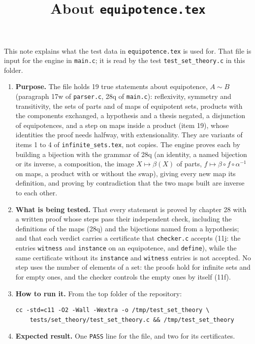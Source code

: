 \documentclass[11pt,a4paper]{article}
\title{About \texttt{equipotence.tex}}
\author{}
\date{}
\begin{document}
\maketitle
This note explains what the test data in \texttt{equipotence.tex} is used for. That file is input for the engine in \texttt{main.c}; it is read by the test \texttt{test\_set\_theory.c} in this folder.

\begin{enumerate}
\item \textbf{Purpose.} The file holds 19 true statements about equipotence, $A \sim B$ (paragraph 17w of \texttt{parser.c}, 28q of \texttt{main.c}): reflexivity, symmetry and transitivity, the sets of parts and of maps of equipotent sets, products with the components exchanged, a hypothesis and a thesis negated, a disjunction of equipotences, and a step on maps inside a product (item 19), whose identities the proof needs halfway, with extensionality. They are variants of items 1 to 4 of \texttt{infinite\_sets.tex}, not copies. The engine proves each by building a bijection with the grammar of 28q (an identity, a named bijection or its inverse, a composition, the image $X \mapsto \beta(X)$ of parts, $f \mapsto \beta \circ f \circ \alpha^{-1}$ on maps, a product with or without the swap), giving every new map its definition, and proving by contradiction that the two maps built are inverse to each other.

\item \textbf{What is being tested.} That every statement is proved by chapter 28 with a written proof whose steps pass their independent check, including the definitions of the maps (28q) and the bijections named from a hypothesis; and that each verdict carries a certificate that \texttt{checker.c} accepts (11j: the entries \texttt{witness} and \texttt{instance} on an equipotence, and \texttt{define}), while the same certificate without its \texttt{instance} and \texttt{witness} entries is not accepted. No step uses the number of elements of a set: the proofs hold for infinite sets and for empty ones, and the checker controls the empty ones by itself (11f).

\item \textbf{How to run it.} From the top folder of the repository:
\begin{verbatim}
cc -std=c11 -O2 -Wall -Wextra -o /tmp/test_set_theory \
    tests/set_theory/test_set_theory.c && /tmp/test_set_theory
\end{verbatim}

\item \textbf{Expected result.} One \texttt{PASS} line for the file, and two for its certificates.
\end{enumerate}
\end{document}
